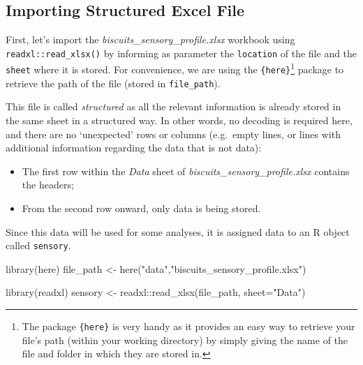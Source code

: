 \documentclass[
]{krantz}
\makeatletter
\newenvironment{Shaded}{\begin{snugshade}}{\end{snugshade}}
\newcommand{\AttributeTok}[1]{\textcolor[rgb]{0.61,0.61,0.61}{#1}}
\newcommand{\FunctionTok}[1]{\textcolor[rgb]{0,0,0}{#1}}
\newcommand{\NormalTok}[1]{#1}
\newcommand{\OtherTok}[1]{\textcolor[rgb]{0.37,0.37,0.37}{#1}}
\newcommand{\SpecialCharTok}[1]{\textcolor[rgb]{0,0,0}{#1}}
\newcommand{\StringTok}[1]{\textcolor[rgb]{0.5,0.5,0.5}{#1}}
\providecommand{\tightlist}{%
  \setlength{\itemsep}{0pt}\setlength{\parskip}{0pt}}
\newenvironment{kframe}{%
\medskip{}
\setlength{\fboxsep}{.8em}
 \def\at@end@of@kframe{}%
 \ifinner\ifhmode%
  \def\at@end@of@kframe{\end{minipage}}%
  \begin{minipage}{\columnwidth}%
 \fi\fi%
 \def\FrameCommand##1{\hskip\@totalleftmargin \hskip-\fboxsep
 \colorbox{shadecolor}{##1}\hskip-\fboxsep
     \hskip-\linewidth \hskip-\@totalleftmargin \hskip\columnwidth}%
 \MakeFramed {\advance\hsize-\width
   \@totalleftmargin\z@ \linewidth\hsize
   \@setminipage}}%
 {\par\unskip\endMakeFramed%
 \at@end@of@kframe}
\renewenvironment{Shaded}{\begin{kframe}}{\end{kframe}}
\makeatother
\begin{document}
\hypertarget{importing-structured-excel-file}{%
\subsection{Importing Structured Excel File}\label{importing-structured-excel-file}}

First, let's import the \emph{biscuits\_sensory\_profile.xlsx} workbook using \texttt{readxl::read\_xlsx()} by informing as parameter the \texttt{location} of the file and the \texttt{sheet} where it is stored. For convenience, we are using the \texttt{\{here\}}\footnote{The package \texttt{\{here\}} is very handy as it provides an easy way to retrieve your file's path (within your working directory) by simply giving the name of the file and folder in which they are stored in.} package to retrieve the path of the file (stored in \texttt{file\_path}).

This file is called \emph{structured} as all the relevant information is already stored in the same sheet in a structured way. In other words, no decoding is required here, and there are no `unexpected' rows or columns (e.g.~empty lines, or lines with additional information regarding the data that is not data):

\begin{itemize}
\tightlist
\item
  The first row within the \emph{Data} sheet of \emph{biscuits\_sensory\_profile.xlsx} contains the headers;
\item
  From the second row onward, only data is being stored.
\end{itemize}

Since this data will be used for some analyses, it is assigned data to an R object called \texttt{sensory}.

\begin{Shaded}
\begin{Highlighting}[]
\FunctionTok{library}\NormalTok{(here)}
\NormalTok{file\_path }\OtherTok{\textless{}{-}} \FunctionTok{here}\NormalTok{(}\StringTok{"data"}\NormalTok{,}\StringTok{"biscuits\_sensory\_profile.xlsx"}\NormalTok{) }

\FunctionTok{library}\NormalTok{(readxl)}
\NormalTok{sensory }\OtherTok{\textless{}{-}}\NormalTok{ readxl}\SpecialCharTok{::}\FunctionTok{read\_xlsx}\NormalTok{(file\_path, }\AttributeTok{sheet=}\StringTok{"Data"}\NormalTok{)}
\end{Highlighting}
\end{Shaded}
\end{document}
